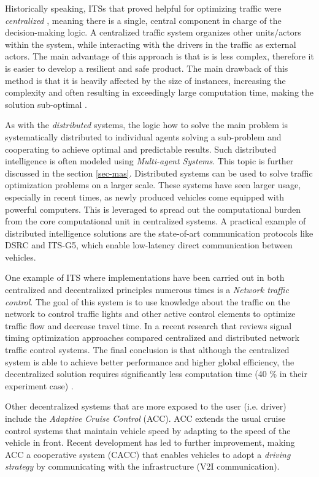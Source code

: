 \documentclass[0main.tex]{subfiles}
\begin{document}
Historically speaking, ITSs that proved helpful for optimizing traffic were \emph{centralized}
\cite{Corman2010}, meaning there is a single, central component in charge of the
decision-making logic. A centralized traffic system organizes other units/actors within the
system, while interacting with the drivers in the traffic as external actors. The main
advantage of this approach is that is is less complex, therefore it is easier to develop a
resilient and safe product. The main drawback of this method is that it is heavily affected by
the size of instances, increasing the complexity and often resulting in exceedingly large
computation time, making the solution sub-optimal \cite{Corman2010}. 

As with the \emph{distributed} systems, the logic how to solve the main problem is systematically distributed to
individual agents solving a sub-problem and cooperating to achieve optimal and predictable
results. Such distributed intelligence is often modeled using \emph{Multi-agent Systems}. This
topic is further discussed in the section \ref{sec-mas}. Distributed systems can be used to
solve traffic optimization problems on a larger scale. These systems have seen larger usage,
especially in recent times, as newly produced vehicles come equipped with powerful computers.
This is leveraged to spread out the computational burden from the core computational unit in centralized
systems. A practical example of distributed intelligence solutions are the state-of-art
communication protocols like DSRC and ITS-G5, which enable low-latency direct communication
between vehicles. 

One example of ITS where implementations have been carried out in both centralized and 
decentralized principles numerous times is a \emph{Network traffic control}. The goal of this 
system is to use knowledge about the traffic on the network to control traffic lights and other 
active control elements to optimize traffic flow and decrease travel time. In a recent research 
that reviews signal timing optimization approaches compared centralized and distributed network traffic
control systems. The final conclusion is that although the centralized system is able
to achieve better performance and higher global efficiency, the decentralized solution requires
significantly less computation time (40 \% in their experiment case) \cite{Chow2019}.

Other decentralized systems that are more exposed to the user (i.e. driver) include the 
\emph{Adaptive Cruise Control} (ACC). ACC extends the usual cruise control systems 
that maintain vehicle speed by adapting to the speed of the vehicle in front.  
Recent development has led to further improvement, making ACC a cooperative system (CACC) that 
enables vehicles to adopt a \emph{driving strategy} by communicating with the infrastructure (V2I 
communication).
\end{document}
